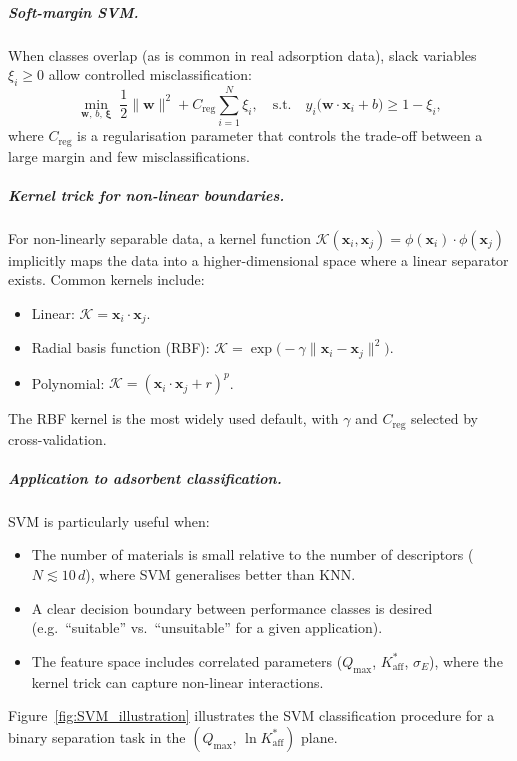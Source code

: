 	\subparagraph{Soft-margin SVM.}
	When classes overlap (as is common in real adsorption data),
	slack variables $\xi_i \ge 0$ allow controlled misclassification:
	\begin{equation}
		\min_{\mathbf{w},\,b,\,\boldsymbol{\xi}}\;
		\frac{1}{2}\|\mathbf{w}\|^2
		+ C_{\mathrm{reg}}\sum_{i=1}^{N}\xi_i,
		\quad\text{s.t.}\quad
		y_i\bigl(\mathbf{w}\cdot\mathbf{x}_i + b\bigr)
		\ge 1 - \xi_i,
		\label{eq:SVM_soft}
	\end{equation}
	where $C_{\mathrm{reg}}$ is a regularisation parameter that
	controls the trade-off between a large margin and few
	misclassifications.

	\subparagraph{Kernel trick for non-linear boundaries.}
	For non-linearly separable data, a kernel function
	$\mathcal{K}(\mathbf{x}_i, \mathbf{x}_j)
	= \phi(\mathbf{x}_i)\cdot\phi(\mathbf{x}_j)$
	implicitly maps the data into a higher-dimensional space where
	a linear separator exists. Common kernels include:
	\begin{itemize}
		\item Linear: $\mathcal{K} = \mathbf{x}_i \cdot \mathbf{x}_j$.
		\item Radial basis function (RBF):
		$\mathcal{K} = \exp\!\bigl(-\gamma\|\mathbf{x}_i
		- \mathbf{x}_j\|^2\bigr)$.
		\item Polynomial:
		$\mathcal{K} = (\mathbf{x}_i\cdot\mathbf{x}_j + r)^p$.
	\end{itemize}
	The RBF kernel is the most widely used default, with
	$\gamma$ and $C_{\mathrm{reg}}$ selected by cross-validation.

	\subparagraph{Application to adsorbent classification.}
	SVM is particularly useful when:
	\begin{itemize}
		\item The number of materials is small relative to the number
		of descriptors ($N \lesssim 10\,d$), where SVM generalises
		better than KNN.
		\item A clear decision boundary between performance classes
		is desired (e.g.\ ``suitable'' vs.\ ``unsuitable'' for a
		given application).
		\item The feature space includes correlated parameters
		($Q_{\max}$, $K_{\mathrm{aff}}^{\ast}$, $\sigma_E$),
		where the kernel trick can capture non-linear interactions.
	\end{itemize}

	Figure~\ref{fig:SVM_illustration} illustrates the SVM
	classification procedure for a binary separation task in
	the $(Q_{\max},\, \ln K_{\mathrm{aff}}^{\ast})$ plane.

